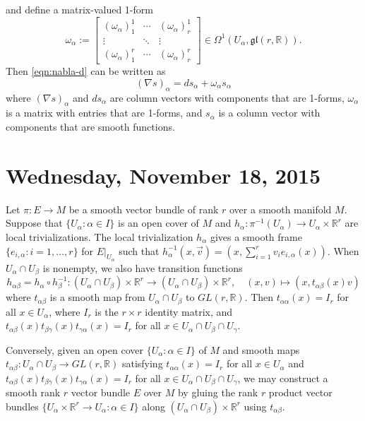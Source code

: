 \documentclass{amsart}
\numberwithin{equation}{section}
\newcommand{\bR}{\mathbb{R}}
\newcommand{\fgl}{\mathfrak{gl}}
\theoremstyle{definition}
\theoremstyle{theorem}
\begin{document}
and define a matrix-valued 1-form
\begin{equation}\label{eqn:omega-matrix} 
\omega_\alpha:=  \begin{bmatrix}
(\omega_\alpha)_1^1 & \cdots & (\omega_\alpha)_r^1 \\
\vdots & \ddots & \vdots  \\
(\omega_\alpha)_1^r & \cdots & (\omega_\alpha)_r^r
\end{bmatrix} \in \Omega^1(U_\alpha,\fgl(r,\bR)).
\end{equation}
Then \eqref{eqn:nabla-d} can be written as
\[
(\nabla s)_\alpha = d s_\alpha + \omega_\alpha s_\alpha
\]
where $(\nabla s)_\alpha$ and $ds_\alpha$ are column vectors with components that are 1-forms,
$\omega_\alpha$ is a matrix with entries that are 1-forms, and $s_\alpha$ is a column vector
with components that are smooth functions.  



\section{Wednesday, November 18, 2015}

Let $\pi:E\to M$ be a smooth vector bundle of rank $r$ over a smooth manifold $M$.
Suppose that $\{ U_\alpha: \alpha\in I\}$ is an open cover of $M$ and 
$h_\alpha: \pi^{-1}(U_\alpha)\to U_\alpha\times \bR^r$ are local trivializations.
The local trivialization $h_\alpha$ gives a smooth frame $\{e_{i,\alpha}:i=1,\ldots,r\}$ for
$E|_{U_\alpha}$ such that $h_\alpha^{-1}(x,\vec{v})= (x, \sum_{i=1}^r v_i e_{i,\alpha}(x))$.
When $U_\alpha\cap U_\beta$ is nonempty, we also have transition functions
$$
h_{\alpha\beta} = h_\alpha\circ h_\beta^{-1}: (U_\alpha\cap U_\beta)\times \bR^r 
\to (U_\alpha\cap U_\beta)\times \bR^r,\quad (x,v)\mapsto (x,t_{\alpha\beta}(x)v)
$$
where $t_{\alpha\beta}$ is a smooth map from $U_\alpha\cap U_\beta$ to $GL(r,\bR)$. Then
$t_{\alpha\alpha}(x)= I_r$ for all $x\in U_\alpha$, where $I_r$ is the $r\times r$ identity matrix,
and $t_{\alpha\beta}(x)t_{\beta\gamma}(x)t_{\gamma\alpha}(x)=I_r$ for all $x\in U_\alpha\cap U_\beta\cap U_\gamma$. 

Conversely, given an open cover $\{U_\alpha:\alpha\in I\}$ of $M$ and 
smooth maps $t_{\alpha\beta}:U_\alpha\cap U_\beta \to GL(r,\bR)$ satisfying
$t_{\alpha\alpha}(x)=I_r$ for all $x\in U_\alpha$ and 
$t_{\alpha\beta}(x)t_{\beta\gamma}(x)t_{\gamma\alpha}(x)=I_r$ for all $x\in U_\alpha\cap U_\beta\cap U_\gamma$, 
we may construct a smooth rank $r$ vector bundle $E$ over $M$ by gluing the rank $r$
product vector bundles $\{ U_\alpha\times \bR^r\to U_\alpha:\alpha\in I\}$
along $(U_\alpha\cap U_\beta)\times \bR^r$ using $t_{\alpha\beta}$. 
\end{document}
